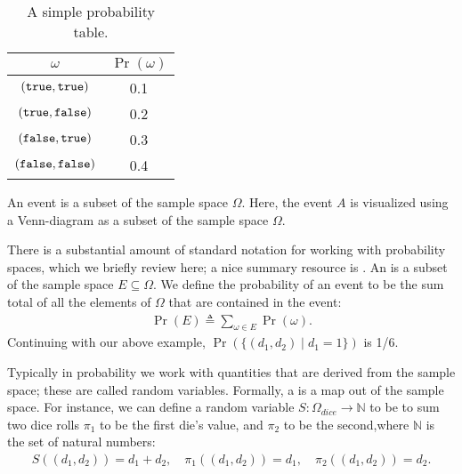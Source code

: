 \documentclass{tufte-handout}
\begin{document}
\begin{table}
    \centering
 \begin{tabular}{c||c}
    \toprule
    $\omega$ & $\Pr(\omega)$ \\
    \midrule 
    $(\texttt{true}, \texttt{true})$ & 0.1 \\ 
    $(\texttt{true}, \texttt{false})$ & 0.2 \\ 
    $(\texttt{false}, \texttt{true})$ & 0.3 \\ 
    $(\texttt{false}, \texttt{false})$ & 0.4 \\ 
    \bottomrule
\end{tabular}
\caption{A simple probability table.}
\label{tbl:simple}
\end{table}

\begin{marginfigure}
        \caption{An event is a subset of the sample space $\Omega$. Here, the event $A$ 
        is visualized using a Venn-diagram as a subset of the sample space $\Omega$.}
\end{marginfigure}

There is a substantial amount of standard notation for working with probability spaces, 
which we briefly review here; a nice summary resource is \citet[Chapter 3]{darwiche2009modeling}.
An  is a subset of the sample space $E \subseteq \Omega$. We define
the probability of an event to be the sum total of all the elements of $\Omega$ that 
are contained in the event:
\begin{align}
    \Pr(E) \triangleq \sum_{\omega \in E} \Pr(\omega).
\end{align}
Continuing with our above example, $\Pr(\{(d_1, d_2) \mid d_1 = 1\})$ is 1/6.

Typically in probability we work with quantities that are derived from the sample space; 
these are called random variables.
Formally, a  is a map out of the sample space. For instance, we can
define a random variable $S : \Omega_{dice} \rightarrow \mathbb{N}$ to be to sum two dice rolls
$\pi_1$ to be the first die's value, and $\pi_2$ to be the second,where
$\mathbb{N}$ is the set of natural numbers:
\begin{align}
    S((d_1, d_2)) = d_1 + d_2, \quad \pi_1((d_1, d_2)) = d_1, \quad \pi_2((d_1, d_2)) = d_2.
    \label{eq:rvs}
\end{align}
\end{document}
